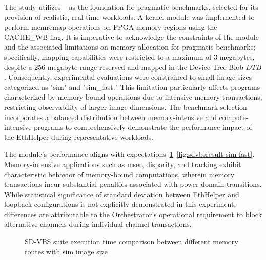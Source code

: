 The study utilizes ~\cite{SD-VBS} as the foundation for pragmatic benchmarks, selected for its provision of realistic, real-time workloads. A kernel module was implemented to perform memremap\(\) operations on FPGA memory regions using the CACHE\_WB flag. It is imperative to acknowledge the constraints of the module and the associated limitations on memory allocation for pragmatic benchmarks; specifically, mapping capabilities were restricted to a maximum of 3 megabytes, despite a 256 megabyte range reserved and mapped in the Device Tree Blob \(DTB\). Consequently, experimental evaluations were constrained to small image sizes categorized as "sim" and "sim\_fast." This limitation particularly affects programs characterized by memory-bound operations due to intensive memory transactions, restricting observability of larger image dimensions. The benchmark selection incorporates a balanced distribution between memory-intensive and compute-intensive programs to comprehensively demonstrate the performance impact of the EthHelper during representative workloads.


The module's performance aligns with expectations~\ref{fig:sdvbsresult-sim}~\ref{fig:sdvbsresult-sim-fast}. Memory-intensive applications such as mser, disparity, and tracking exhibit characteristic behavior of memory-bound computations, wherein memory transactions incur substantial penalties associated with power domain transitions. While statistical significance of standard deviation between EthHelper and loopback configurations is not explicitly demonstrated in this experiment, differences are attributable to the Orchestrator's operational requirement to block alternative channels during individual channel transactions.


\begin{figure}
  \centering
  
  \caption{SD-VBS suite execution time comparison between different memory routes with sim image size}
  \label{fig:sdvbsresult-sim}
\end{figure}

